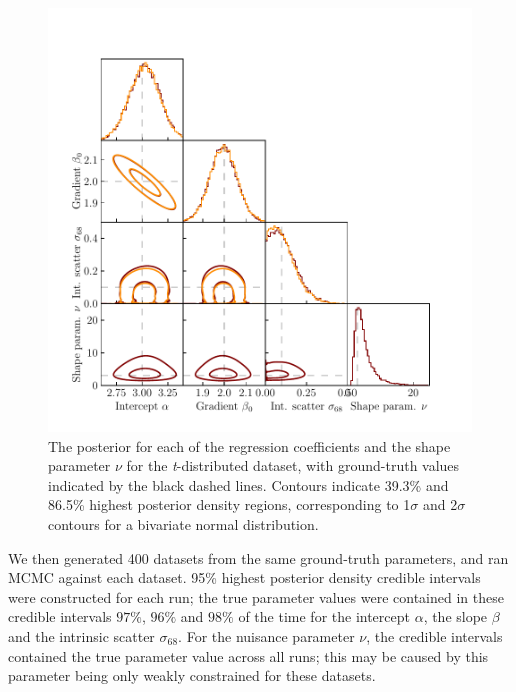 \documentclass[fleqn,usenatbib]{rasti}
\begin{document}
\begin{figure}
    \includegraphics[width=\columnwidth]{graphics/fixed/corner_t.pdf}
    \caption{The posterior for each of the regression coefficients and the shape
    parameter $\nu$ for the \textit{t}-distributed dataset, with ground-truth
    values indicated by the black dashed lines. Contours indicate 39.3\% and
    86.5\% highest posterior density regions, corresponding to 1$\sigma$ and
    2$\sigma$ contours for a bivariate normal distribution.}
    \label{fig:results.t.corner}
\end{figure}

We then generated 400 datasets from the same ground-truth parameters, and ran
MCMC against each dataset.
95\% highest posterior density credible intervals were constructed for each run;
the true parameter values were contained in these credible intervals $97\%$,
$96\%$ and $98\%$ of the time for the intercept $\alpha$, the slope $\beta$ and
the intrinsic scatter $\sigma_{68}$. For the nuisance parameter $\nu$, the
credible intervals contained the true parameter value across all runs; this may
be caused by this parameter being only weakly constrained for these datasets.
\end{document}
